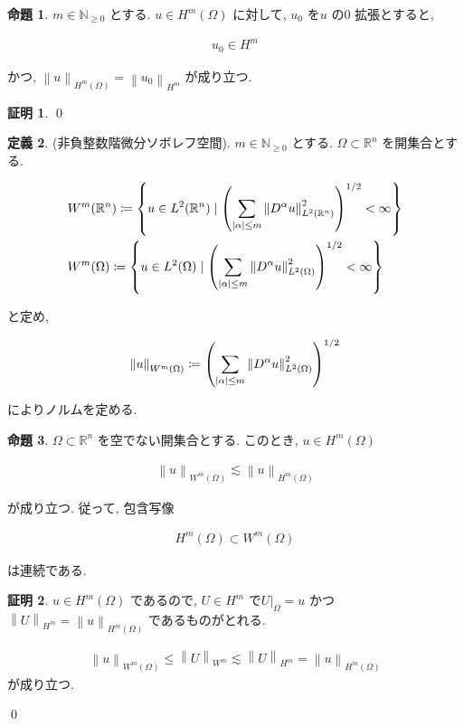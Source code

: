 \documentclass[10pt, fleqn, label-section=none]{bxjsarticle}
\theoremstyle{definition}
\newtheorem{dfn}{定義}[section]
\newtheorem{prop}[dfn]{命題}
\newtheorem*{pf*}{証明}
\newcommand{\paren}[1]{\mleft( #1\mright )}
\newcommand{\cbra}[1]{\mleft\{#1\mright\}}
\newcommand{\abs}[1]{\left|#1\right|}
\newcommand{\norm}[1]{\left\|#1\right\|}
\renewcommand{\;}{\, ; \,}
\begin{document}
\begin{prop}$m \in \mathbb N_{\geq 0}$ とする. $u \in H^m(\Omega)$ に対して, $u_0$ を$u$ の$0$ 拡張とすると, 

\begin{align*} u_0 \in H^m \end{align*}

かつ, $\norm{u}_{H^m(\Omega)} = \norm{u_0}_{H^m}$ が成り立つ. 

\end{prop}
\begin{pf*}

\qed
\end{pf*}


\begin{dfn}(非負整数階微分ソボレフ空間). $m \in \mathbb N_{\geq 0}$ とする. $\Omega \subset \mathbb R^n$ を開集合とする. 

\begin{align*} & W^m(\mathbb R^n) \coloneqq \cbra{u \in L^2(\mathbb R^n) \mid \paren{ \sum_{\abs{\alpha} \leq m } \norm{ D^\alpha u}_{L^2(\mathbb R^n)} ^2 }^{1/2} < \infty  } 
\\ & W^m(\Omega ) \coloneqq \cbra{u \in L^2(\Omega ) \mid \paren{ \sum_{\abs{\alpha} \leq m } \norm{ D^\alpha u}_{L^2(\Omega )} ^2 }^{1/2} < \infty  } 
\end{align*}

と定め, 

\begin{align*} \norm{u}_{W^m(\Omega)}  \coloneqq \paren{ \sum_{\abs{\alpha} \leq m } \norm{ D^\alpha u}_{L^2(\Omega )} ^2 }^{1/2}       \end{align*}

によりノルムを定める.

\end{dfn}



\begin{prop}$\Omega \subset \mathbb R^n$ を空でない開集合とする. このとき, $u \in H^m(\Omega)$

\begin{align*} \norm{u}_{W^m(\Omega)} \lesssim \norm{u}_{H^m(\Omega)}\end{align*}

が成り立つ. 従って, 包含写像

\begin{align*} H^m(\Omega) \subset W^m(\Omega ) \end{align*}

は連続である. 

\end{prop}
\begin{pf*}

$u \in H^m(\Omega)$ であるので, $U \in H^m$ で$U|_{\Omega } = u$ かつ$\norm{U}_{H^m} = \norm{u}_{H^m(\Omega)}$ であるものがとれる. 

\begin{align*} \norm{u}_{W^m(\Omega)} \leq \norm{U}_{W^m} \lesssim \norm{U}_{H^m} = \norm{u}_{H^m(\Omega)} \end{align*} 
が成り立つ. 

\qed
\end{pf*}
\end{document}
